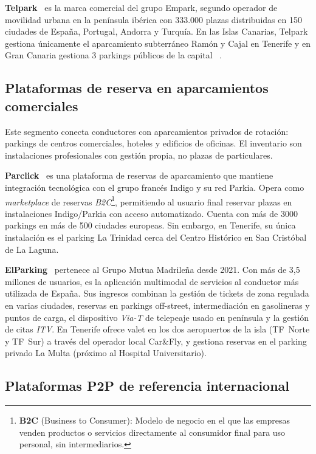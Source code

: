 \textbf{Telpark}~\cite{empark2026} es la marca comercial del grupo Empark, segundo operador de movilidad urbana en la península ibérica con 333.000 plazas distribuidas en 150 ciudades de España, Portugal, Andorra y Turquía. En las Islas Canarias, Telpark gestiona únicamente el aparcamiento subterráneo Ramón y Cajal en Tenerife y en Gran Canaria gestiona 3 parkings públicos de la capital ~\cite{telpark2026}.

\subsection{Plataformas de reserva en aparcamientos comerciales}

Este segmento conecta conductores con aparcamientos privados de rotación: parkings de centros comerciales, hoteles y edificios de oficinas. El inventario son instalaciones profesionales con gestión propia, no plazas de particulares.

\textbf{Parclick}~\cite{parclick2026} es una plataforma de reservas de aparcamiento que mantiene integración tecnológica con el grupo francés Indigo y su red Parkia. Opera como \textit{marketplace} de reservas \textit{B2C}\footnote{\textbf{B2C} (Business to Consumer): Modelo de negocio en el que las empresas venden productos o servicios directamente al consumidor final para uso personal, sin intermediarios.}, permitiendo al usuario final reservar plazas en instalaciones Indigo/Parkia con acceso automatizado. Cuenta con más de 3000 parkings en más de 500 ciudades europeas. Sin embargo, en Tenerife, su única instalación es el parking La Trinidad cerca del Centro Histórico en San Cristóbal de La Laguna.

\textbf{ElParking}~\cite{elparking2026} pertenece al Grupo Mutua Madrileña desde 2021. Con más de 3,5 millones de usuarios, es la aplicación multimodal de servicios al conductor más utilizada de España. Sus ingresos combinan la gestión de tickets de zona regulada en varias ciudades, reservas en parkings off-street, intermediación en gasolineras y puntos de carga, el dispositivo \textit{Via-T} de telepeaje usado en península y la gestión de citas \textit{ITV}. En Tenerife ofrece valet en los dos aeropuertos de la isla (TF~Norte y TF~Sur) a través del operador local Car\&Fly, y gestiona reservas en el parking privado La Multa (próximo al Hospital Universitario).

\subsection{Plataformas P2P de referencia internacional}

